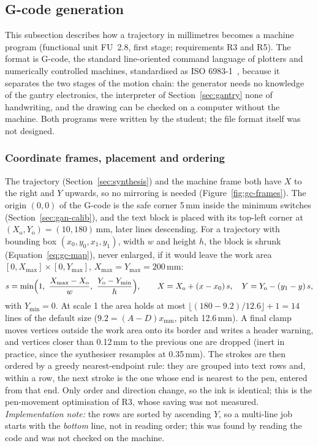 \subsection{G-code generation}
\label{sec:gcode}

This subsection describes how a trajectory in millimetres becomes a machine program (functional unit FU~2.8, first stage; requirements R3 and R5).
The format is G-code, the standard line-oriented command language of plotters and numerically controlled machines, standardised as ISO 6983-1~\cite{iso6983}, because it separates the two stages of the motion chain: the generator needs no knowledge of the gantry electronics, the interpreter of Section~\ref{sec:gantry} none of handwriting, and the drawing can be checked on a computer without the machine.
Both programs were written by the student; the file format itself was not designed.

\subsubsection{Coordinate frames, placement and ordering}

The trajectory (Section~\ref{sec:synthesis}) and the machine frame both have $X$ to the right and $Y$ upwards, so no mirroring is needed (Figure~\ref{fig:gc-frames}).
The origin $(0,0)$ of the G-code is the safe corner 5\,mm inside the minimum switches (Section~\ref{sec:gan-calib}), and the text block is placed with its top-left corner at $(X_{\mathrm o},Y_{\mathrm o})=(10,180)$\,mm, later lines descending.
For a trajectory with bounding box $(x_0,y_0,x_1,y_1)$, width $w$ and height $h$, the block is shrunk (Equation~\ref{eq:gc-map}), never enlarged, if it would leave the work area $[0,X_{\max}]\times[0,Y_{\max}]$, $X_{\max}=Y_{\max}=200$\,mm:
\begin{equation}
s=\min\Bigl(1,\ \frac{X_{\max}-X_{\mathrm o}}{w},\ \frac{Y_{\mathrm o}-Y_{\min}}{h}\Bigr),\qquad X=X_{\mathrm o}+(x-x_0)\,s,\quad Y=Y_{\mathrm o}-(y_1-y)\,s,
\label{eq:gc-map}
\end{equation}
with $Y_{\min}=0$.
At scale 1 the area holds at most $\lfloor(180-9.2)/12.6\rfloor+1=14$ lines of the default size ($9.2=(A-D)x_{\mathrm{mm}}$, pitch 12.6\,mm).
A final clamp moves vertices outside the work area onto its border and writes a header warning, and vertices closer than 0.12\,mm to the previous one are dropped (inert in practice, since the synthesiser resamples at 0.35\,mm).
The strokes are then ordered by a greedy nearest-endpoint rule: they are grouped into text rows and, within a row, the next stroke is the one whose end is nearest to the pen, entered from that end.
Only order and direction change, so the ink is identical; this is the pen-movement optimisation of R3, whose saving was not measured.
\emph{Implementation note:} the rows are sorted by ascending $Y$, so a multi-line job starts with the \emph{bottom} line, not in reading order; this was found by reading the code and was not checked on the machine.

